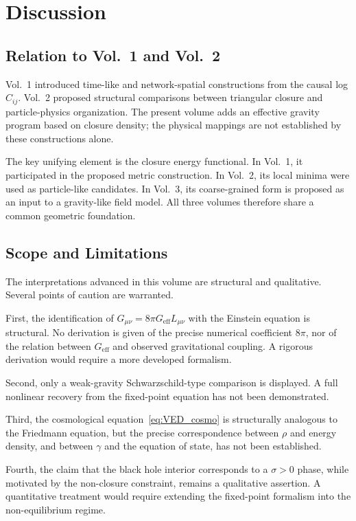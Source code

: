 \section{Discussion}
\label{sec:discussion}

\subsection{Relation to Vol.~1 and Vol.~2}

Vol.~1 introduced time-like and network-spatial constructions from the causal
log $C_{ij}$. Vol.~2 proposed structural comparisons between triangular
closure and particle-physics organization. The present volume adds an
effective gravity program based on closure density; the physical mappings are
not established by these constructions alone.

The key unifying element is the closure energy functional.
In Vol.~1, it participated in the proposed metric construction. In Vol.~2,
its local minima were used as particle-like candidates. In Vol.~3, its
coarse-grained form is proposed as an input to a gravity-like field model.
All three volumes therefore share a common geometric foundation.

\subsection{Scope and Limitations}

The interpretations advanced in this volume are structural and qualitative.
Several points of caution are warranted.

First, the identification of $G_{\mu\nu} = 8\pi G_{\text{eff}} L_{\mu\nu}$
with the Einstein equation is structural.
No derivation is given of the precise numerical coefficient $8\pi$,
nor of the relation between $G_{\text{eff}}$ and observed gravitational coupling.
A rigorous derivation would require a more developed formalism.

Second, only a weak-gravity Schwarzschild-type comparison is displayed. A
full nonlinear recovery from the fixed-point equation has not been
demonstrated.

Third, the cosmological equation~\eqref{eq:VED_cosmo} is structurally
analogous to the Friedmann equation, but the precise correspondence
between $\rho$ and energy density, and between $\gamma$ and the equation
of state, has not been established.

Fourth, the claim that the black hole interior corresponds to a
$\sigma > 0$ phase, while motivated by the non-closure constraint,
remains a qualitative assertion.
A quantitative treatment would require extending the fixed-point formalism
into the non-equilibrium regime.

